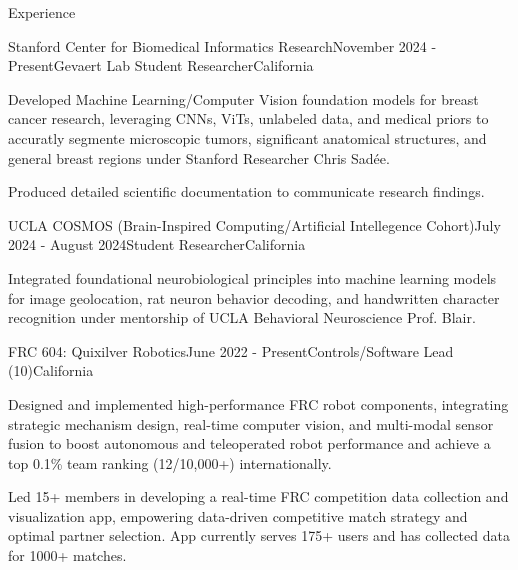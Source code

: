 \documentclass[
  10pt, %
]{resume}
\begin{document}
\sloppy


\begin{rSection}{Experience}


  \begin{rSubsection}{Stanford Center for Biomedical Informatics Research}{November 2024 - Present}{Gevaert Lab Student Researcher}{California}
    
    \item Developed Machine Learning/Computer Vision foundation models for breast cancer research, leveraging CNNs, ViTs, unlabeled data, and medical priors to accuratly segmente microscopic tumors, significant anatomical structures, and general breast regions under Stanford Researcher Chris Sadée.
    
    \item Produced detailed scientific documentation to communicate research findings.
    
  \end{rSubsection}
        
  \begin{rSubsection}{UCLA COSMOS (Brain-Inspired Computing/Artificial Intellegence Cohort)}{July 2024 - August 2024}{Student Researcher}{California}
    
    \item Integrated foundational neurobiological principles into machine learning models for image geolocation, rat neuron behavior decoding, and handwritten character recognition under mentorship of UCLA Behavioral Neuroscience Prof. Blair.
    
  \end{rSubsection}
        
  \begin{rSubsection}{FRC 604: Quixilver Robotics}{June 2022 - Present}{Controls/Software Lead (10)}{California}
    
    \item Designed and implemented high-performance FRC robot components, integrating strategic mechanism design, real-time computer vision, and multi-modal sensor fusion to boost autonomous and teleoperated robot performance and achieve a top 0.1\% team ranking (12/10,000+) internationally.
    
    \item Led 15+ members in developing a real-time FRC competition data collection and visualization app, empowering data-driven competitive match strategy and optimal partner selection. App currently serves 175+ users and has collected data for 1000+ matches.
    

\end{rSubsection}
\end{rSection}
\end{document}
